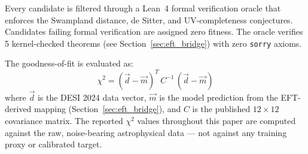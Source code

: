 Every candidate is filtered through a Lean~4 formal verification oracle that enforces the Swampland distance, de Sitter, and UV-completeness conjectures. Candidates failing formal verification are assigned zero fitness. The oracle verifies 5 kernel-checked theorems (see Section~\ref{sec:eft_bridge}) with zero \texttt{sorry} axioms.

The goodness-of-fit is evaluated as:
\begin{equation}
    \chi^2 = (\vec{d} - \vec{m})^T \, C^{-1} \, (\vec{d} - \vec{m})
\end{equation}
where $\vec{d}$ is the DESI 2024 data vector, $\vec{m}$ is the model prediction from the EFT-derived mapping (Section~\ref{sec:eft_bridge}), and $C$ is the published $12 \times 12$ covariance matrix. The reported $\chi^2$ values throughout this paper are computed against the raw, noise-bearing astrophysical data --- not against any training proxy or calibrated target.
